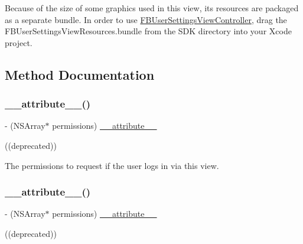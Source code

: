 Because of the size of some graphics used in this view, its resources are packaged as a separate bundle. In order to use {\ttfamily \hyperlink{interfaceFBUserSettingsViewController}{F\+B\+User\+Settings\+View\+Controller}}, drag the {\ttfamily F\+B\+User\+Settings\+View\+Resources.\+bundle} from the S\+DK directory into your Xcode project. 

\subsection{Method Documentation}
\mbox{\label{interfaceFBUserSettingsViewController_a5ff3dd369720aa3e7f79439735be3292}} 
\subsubsection{\texorpdfstring{\+\_\+\+\_\+attribute\+\_\+\+\_\+()}{\_\_attribute\_\_()}\hspace{0.1cm}{\footnotesize\ttfamily [1/5]}}
{\footnotesize\ttfamily -\/ (N\+S\+Array$\ast$ permissions) \hyperlink{struct____attribute____}{\+\_\+\+\_\+attribute\+\_\+\+\_\+} \begin{DoxyParamCaption}\item[{((deprecated))}]{ }\end{DoxyParamCaption}}

The permissions to request if the user logs in via this view. \mbox{\label{interfaceFBUserSettingsViewController_a5ff3dd369720aa3e7f79439735be3292}} 
\subsubsection{\texorpdfstring{\+\_\+\+\_\+attribute\+\_\+\+\_\+()}{\_\_attribute\_\_()}\hspace{0.1cm}{\footnotesize\ttfamily [2/5]}}
{\footnotesize\ttfamily -\/ (N\+S\+Array$\ast$ permissions) \hyperlink{struct____attribute____}{\+\_\+\+\_\+attribute\+\_\+\+\_\+} \begin{DoxyParamCaption}\item[{((deprecated))}]{ }\end{DoxyParamCaption}}

